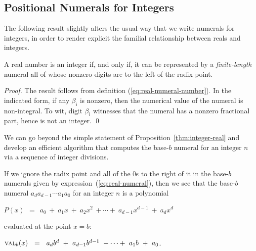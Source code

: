 \subsection{Positional Numerals for Integers}
\label{sec:special-numerals-N}


The following result slightly alters the usual way that we write numerals for integers, in order to render explicit the familial relationship between reals and integers.


\begin{prop}
\label{thm:integer-real}
A real number is an integer if, and only if, it can be represented by a {\em finite-length} numeral all of whose nonzero digits are to the left of the radix point.
\end{prop}

\begin{proof}
The result follows from definition (\ref{eq:real-numeral-number}).  In the indicated form, if any $\beta_i$ is nonzero, then the numerical value of the numeral is non-integral.  To wit, digit $\beta_i$ witnesses that the numeral has a nonzero fractional part, hence is not an integer.  \qed
\end{proof}

\medskip

We can go beyond the simple statement of Proposition~\ref{thm:integer-real} and develop an efficient algorithm that computes the base-$b$ numeral for an integer $n$ via a sequence of integer divisions.

\bigskip

If we ignore the radix point and all of the $0$s to the right of it in the base-$b$ numerals given by expression~(\ref{eq:real-numeral}), then we see that the base-$b$ numeral $a_d a_{d-1} \cdots a_1 a_0$ for an integer $n$ is a polynomial

\smallskip

$P(x) \ \ = \ \ a_0 \ + \ a_1 x \ + \ a_2 x^2 \ + \cdots + \ a_{d-1} x^{d-1} \ + \ a_d x^d$

\smallskip

\noindent
evaluated at the point $x=b$:

\smallskip

$\mbox{\sc val}_{b}(x) \ \ = \ \ a_d b^d \ + \ a_{d-1} b^{d-1} \ + \cdots + \ a_1 b \ + \ a_0$.

